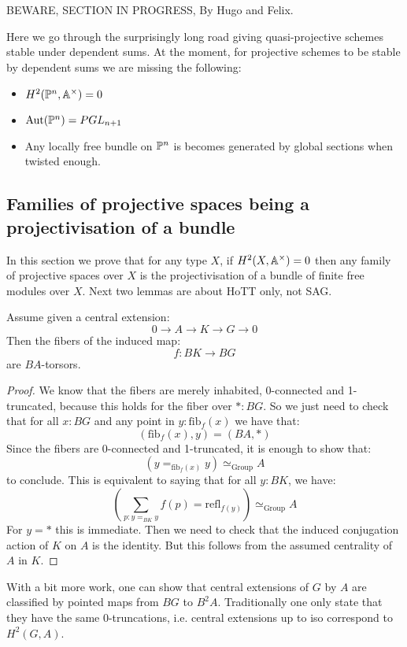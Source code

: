 
BEWARE, SECTION IN PROGRESS, By Hugo and Felix.

Here we go through the surprisingly long road giving quasi-projective schemes stable under dependent sums. At the moment, for projective schemes to be stable by dependent sums we are missing the following:
\begin{itemize}
\item $H^2(\mathbb{P}^n,\mathbb{A}^\times) = 0$ 
\item $\mathrm{Aut}(\mathbb{P}^n) = PGL_{n+1}$
\item Any locally free bundle on $\mathbb{P}^n$ is becomes generated by global sections when twisted enough.
\end{itemize}


\subsection{Families of projective spaces being a projectivisation of a bundle}

In this section we prove that for any type $X$, if $H^2(X,\mathbb{A}^\times) = 0$ then any family of projective spaces over $X$ is the projectivisation of a bundle of finite free modules over $X$. Next two lemmas are about HoTT only, not SAG.

\begin{lemma}
Assume given a central extension:
\[0 \to A \to K \to G \to 0\]
Then the fibers of the induced map:
\[f:BK\to BG\]
are $BA$-torsors.
\end{lemma}

\begin{proof}
We know that the fibers are merely inhabited, 0-connected and 1-truncated, because this holds for the fiber over $*:BG$. So we just need to check that for all $x:BG$ and any point in $y:\mathrm{fib}_f(x)$ we have that:
\[(\mathrm{fib}_f(x),y) = (BA,*)\]
Since the fibers are 0-connected and 1-truncated, it is enough to show that:
\[(y=_{\mathrm{fib}_f(x)}y) \simeq_{\mathrm{Group}} A\]
to conclude. This is equivalent to saying that for all $y:BK$, we have:
\[\left(\sum_{p : y=_{BK}y} f(p) = \mathrm{refl}_{f(y)}\right) \simeq_{\mathrm{Group}} A\]
For $y=*$ this is immediate. Then we need to check that the induced conjugation action of $K$ on $A$ is the identity. But this follows from the assumed centrality of $A$ in $K$.
\end{proof}

\begin{remark}
With a bit more work, one can show that central extensions of $G$ by $A$ are classified by pointed maps from $BG$ to $B^2A$. Traditionally one only state that they have the same $0$-truncations, i.e. central extensions up to iso correspond to $H^2(G,A)$. 
\end{remark}

